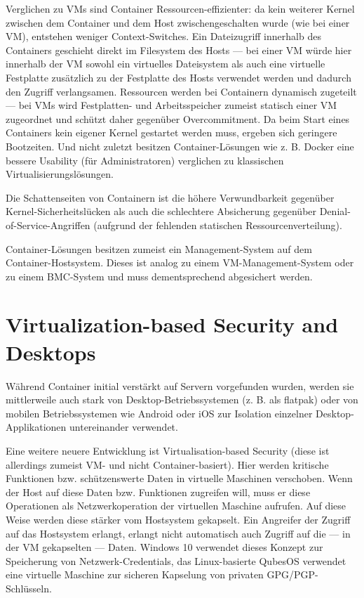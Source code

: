 Verglichen zu VMs sind Container Ressourcen-effizienter: da kein weiterer Kernel zwischen dem Container und dem Host zwischengeschalten wurde (wie bei einer VM), entstehen weniger Context-Switches. Ein Dateizugriff innerhalb des Containers geschieht direkt im Filesystem des Hosts --- bei einer VM würde hier innerhalb der VM sowohl ein virtuelles Dateisystem als auch eine virtuelle Festplatte zusätzlich zu der Festplatte des Hosts verwendet werden und dadurch den Zugriff verlangsamen. Ressourcen werden bei Containern dynamisch zugeteilt --- bei VMs wird Festplatten- und Arbeitsspeicher zumeist statisch einer VM zugeordnet und schützt daher gegenüber Overcommitment. Da beim Start eines Containers kein eigener Kernel gestartet werden muss, ergeben sich geringere Bootzeiten. Und nicht zuletzt besitzen Container-Lösungen wie z. B. Docker eine bessere Usability (für Administratoren) verglichen zu klassischen Virtualisierungslösungen.

Die Schattenseiten von Containern ist die höhere Verwundbarkeit gegenüber Kernel-Sicherheitslücken als auch die schlechtere Absicherung gegenüber Denial-of-Service-Angriffen (aufgrund der fehlenden statischen Ressourcenverteilung).

Container-Lösungen besitzen zumeist ein Management-System auf dem Container-Hostsystem. Dieses ist analog zu einem VM-Management-System oder zu einem BMC-System und muss dementsprechend abgesichert werden.

\section{Virtualization-based Security and Desktops}

Während Container initial verstärkt auf Servern vorgefunden wurden, werden sie mittlerweile auch stark von Desktop-Betriebssystemen (z. B. als flatpak) oder von mobilen Betriebssystemen wie Android oder iOS zur Isolation einzelner Desktop-Applikationen untereinander verwendet.

Eine weitere neuere Entwicklung ist Virtualisation-based Security (diese ist allerdings zumeist VM- und nicht Container-basiert). Hier werden kritische Funktionen bzw. schützenswerte Daten in virtuelle Maschinen verschoben. Wenn der Host auf diese Daten bzw. Funktionen zugreifen will, muss er diese Operationen als Netzwerkoperation der virtuellen Maschine aufrufen. Auf diese Weise werden diese stärker vom Hostsystem gekapselt. Ein Angreifer der Zugriff auf das Hostsystem erlangt, erlangt nicht automatisch auch Zugriff auf die --- in der VM gekapselten --- Daten. Windows 10 verwendet dieses Konzept zur Speicherung von Netzwerk-Credentials, das Linux-basierte QubesOS verwendet eine virtuelle Maschine zur sicheren Kapselung von privaten GPG/PGP-Schlüsseln.

